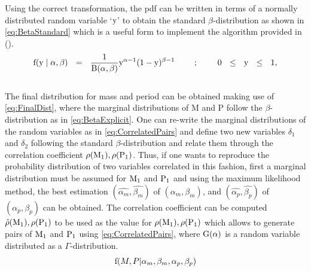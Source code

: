 Using the correct transformation, the pdf can be written in terms of a normally distributed random variable `$\textnormal{y}$' to obtain the standard $\beta$-distribution as shown in \autoref{eq:BetaStandard} which is a useful form to implement the algorithm provided in  (\citeyear{2004CMS...46.397M}).\\    

\begingroup
\Large
\begin{equation}
  \textnormal{f}(\textnormal{y} \mid \alpha, \beta)~~=~~\frac{1}{\textnormal{B}(\alpha, \beta)} \textnormal{y}^{\alpha -1}(1-\textnormal{y})^{\beta-1}~~~~~~~;~~~~~~~\textnormal{0} ~~\leq ~~\textnormal{y} ~~\leq ~~\textnormal{1},
 \label{eq:BetaStandard}
\end{equation}
\endgroup\\

The final distribution for mass and period can be obtained making use of \autoref{eq:FinalDist}, where the marginal distributions of M and P follow the $\beta$-distribution as in \autoref{eq:BetaExplicit}. One can re-write the marginal distributions of the random variables as in \autoref{eq:CorrelatedPairs} and define two new variables $\delta_1$ and $\delta_2$ following the standard $\beta$-distribution and relate them through the correlation coefficient $\rho(\textnormal{M}_1), \rho(\textnormal{P}_1)$. Thus, if one wants to reproduce the probability distribution of two variables correlated in this fashion, first a marginal distribution must be assumed for $\textnormal{M}_1$ and $\textnormal{P}_1$ and using the maximum likelihood method, the best estimation $(\hat{\alpha_m},\hat{\beta_m})$ of $(\alpha_m,\beta_m)$, and $(\hat{\alpha_p},\hat{\beta_p})$ of $(\alpha_p,\beta_p)$ can be obtained. The correlation coefficient can be computed $\hat{\rho}(\textnormal{M}_1), \rho(\textnormal{P}_1)$ to be used as the value for $\rho(\textnormal{M}_1), \rho(\textnormal{P}_1)$ which allows to generate pairs of $\textnormal{M}_1$ and $\textnormal{P}_1$ using \autoref{eq:CorrelatedPairs}, where $\textnormal{G}(\alpha)$ is a random variable distributed as a $\Gamma$-distribution.\\   

\begingroup
\Large
\begin{equation}
    \textnormal{f}(M, P | \alpha_m, \beta_m,\alpha_p, \beta_p )
    \label{eq:FinalDist}
\end{equation}
\endgroup

